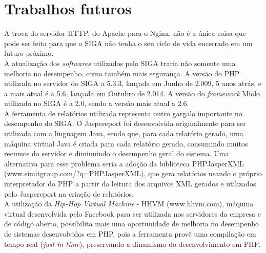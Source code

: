 \section{Trabalhos futuros}
A troca do servidor HTTP, do Apache para o Nginx, não é a única coisa que pode 
ser feita para que o SIGA não tenha o seu ciclo de vida encerrado em um futuro 
próximo.\\
A atualização dos \textit{softwares} utilizados pelo SIGA traria não somente 
uma melhoria no desempenho, como também mais segurança. A versão do PHP 
utilizada no servidor do SIGA a 5.3.3, lançada em Junho de 2.009, 5 anos atrás, 
e a mais atual é a 5.6, lançada em Outubro de 2.014. A versão do 
\textit{framework} Miolo utilizado no SIGA é a 2.0, sendo a versão mais atual a 
2.6.\\
A ferramenta de relatórios utilizada representa outro gargalo importante no 
desempenho do SIGA. O Jaspereport foi desenvolvida originalmente para ser 
utilizada com a linguagem Java, sendo que, para cada relatório gerado, uma 
máquina virtual Java é criada para cada relatório gerado, consumindo muitos 
recursos do servidor e diminuindo o desempenho geral do sistema. Uma 
alternativa para esse problema seria a adoção da biblioteca PHPJasperXML 
(www.simitgroup.com/?q=PHPJasperXML), que gera relatórios usando o próprio 
interpretador do PHP a partir da leitura dos arquivos XML gerados e utilizados 
pelo Jaspereport na criação de relatórios.\\
A utilização da \textit{Hip-Hop Virtual Machine} - HHVM (www.hhvm.com), máquina 
virtual desenvolvida pelo Facebook para ser utilizada nos servidores da empresa 
e de código aberto, possibilita mais uma oportunidade de melhoria no desempenho 
de sistemas desenvolvidos em PHP, pois a ferramenta provê uma compilação em 
tempo real (\textit{just-in-time}), preservando a dinamismo do desenvolvimento 
em PHP.